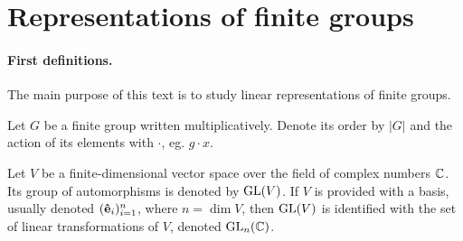 \clearpage{\thispagestyle{empty}}
\section{Representations of finite groups}


\paragraph{First definitions.}

The main purpose of this text is to study linear representations of finite groups.

Let $G$ be a finite group written multiplicatively. Denote its order by $|G|$ and the action of its elements with $\cdot$, eg. $g \cdot x$.

Let $V$ be a finite-dimensional vector space over the field of complex numbers $\mathbb{C}$. Its group of automorphisms is denoted by $\text{GL}(V)$. If $V$ is provided with a basis, usually denoted $(\mathbf{\hat{e}}_i)_{i=1}^n$, where $n = \dim V$, then $\text{GL}(V)$ is identified with the set of linear transformations of $V$, denoted $\text{GL}_n(\mathbb{C})$\cite[18.1]{DummitFoote}.

